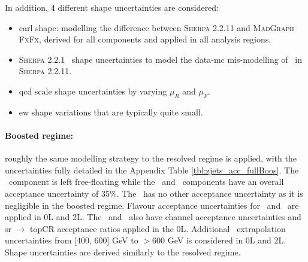 In addition, 4 different shape uncertainties are considered:
\begin{itemize}
    \item \gls{carl} shape: modelling the difference between \textsc{Sherpa} 2.2.11 and \textsc{MadGraph FxFx}, derived for all components and applied in all analysis regions.
    \item \textsc{Sherpa} 2.2.1 \ptv\ shape uncertainties to model the data-\gls{mc} mis-modelling of  \ptv\ in \textsc{Sherpa} 2.2.11.
    \item \gls{qcd} scale shape uncertainties by varying $\mu_R$ and $\mu_F$.
    \item \gls{ew} shape variations that are typically quite small.
\end{itemize} 

\paragraph{Boosted regime:} roughly the same modelling strategy to the resolved regime is applied, with the uncertainties fully detailed in the Appendix Table \ref{tbl:zjets_acc_fullBoos}. The \zhf\ component is left free-floating while the \zmf\ and \zlf\ components have an overall acceptance uncertainty of 35\%. The \zlf\ has no other acceptance uncertainty as it is negligible in the boosted regime. Flavour acceptance uncertainties for \zhf\ and \zmf\ are applied in 0L and 2L. The \zhf\ and \zmf\ also have channel acceptance uncertainties and \gls{sr} $\rightarrow$ topCR acceptance ratios applied in the 0L. Additional \ptv\ extrapolation uncertainties from [400, 600] GeV to $> 600$ GeV is considered in 0L and 2L. Shape uncertainties are derived similarly to the resolved regime. 

